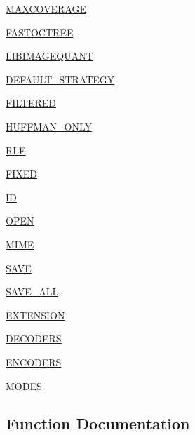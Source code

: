 \begin{DoxyCompactItemize}
\item 
\hyperlink{namespacePIL_1_1Image_a3f9e129f01d03a117c114a8389e0ef05}{M\+A\+X\+C\+O\+V\+E\+R\+A\+GE}
\item 
\hyperlink{namespacePIL_1_1Image_ae63737b96bae9ff9ad327c3e9c3845d3}{F\+A\+S\+T\+O\+C\+T\+R\+EE}
\item 
\hyperlink{namespacePIL_1_1Image_a9e70f57a16954fbe77477f38386ab407}{L\+I\+B\+I\+M\+A\+G\+E\+Q\+U\+A\+NT}
\item 
\hyperlink{namespacePIL_1_1Image_ae93d5c2bd54fd7cdb387fde28c361923}{D\+E\+F\+A\+U\+L\+T\+\_\+\+S\+T\+R\+A\+T\+E\+GY}
\item 
\hyperlink{namespacePIL_1_1Image_a2c82eec166c5610d23aef735afde78bb}{F\+I\+L\+T\+E\+R\+ED}
\item 
\hyperlink{namespacePIL_1_1Image_afeb560fa4f1a1aa9ec2afb850c15b019}{H\+U\+F\+F\+M\+A\+N\+\_\+\+O\+N\+LY}
\item 
\hyperlink{namespacePIL_1_1Image_ae161e7e8dbe10a12eaa99dcd4d97666b}{R\+LE}
\item 
\hyperlink{namespacePIL_1_1Image_a1a8926d64bcff7bd5800a47205dc1653}{F\+I\+X\+ED}
\item 
\hyperlink{namespacePIL_1_1Image_a49e7ef006c4c5c6edc488fc40370a88e}{ID}
\item 
\hyperlink{namespacePIL_1_1Image_afae9c0cadc39957067d5aa4502f3ae12}{O\+P\+EN}
\item 
\hyperlink{namespacePIL_1_1Image_adcc2b082d0b0176a2d4963a0e3ddb5e6}{M\+I\+ME}
\item 
\hyperlink{namespacePIL_1_1Image_ad43f6e7264df214cfb317ce966b5268d}{S\+A\+VE}
\item 
\hyperlink{namespacePIL_1_1Image_a7bd3bed092c97814140844576cb9e0d0}{S\+A\+V\+E\+\_\+\+A\+LL}
\item 
\hyperlink{namespacePIL_1_1Image_afbd2487418ee23847721106563d04e0a}{E\+X\+T\+E\+N\+S\+I\+ON}
\item 
\hyperlink{namespacePIL_1_1Image_aba87c5056b8a39560e636e7b38dd056e}{D\+E\+C\+O\+D\+E\+RS}
\item 
\hyperlink{namespacePIL_1_1Image_a63d6d00d4814246ffa390a568def72c4}{E\+N\+C\+O\+D\+E\+RS}
\item 
\hyperlink{namespacePIL_1_1Image_a2711b049990d84cedfa8d912c9efb799}{M\+O\+D\+ES}
\end{DoxyCompactItemize}


\subsection{Function Documentation}
\mbox{\label{namespacePIL_1_1Image_af8d4e74b562bf94355af0c4fa545c562}} 
